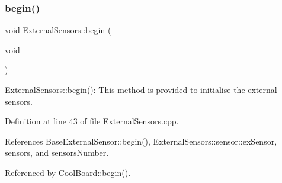 \subsubsection{\texorpdfstring{begin()}{begin()}}
{\footnotesize\ttfamily void External\+Sensors\+::begin (\begin{DoxyParamCaption}\item[{void}]{ }\end{DoxyParamCaption})}

\hyperlink{classExternalSensors_a58ede0d786a86417254708870f04a21e}{External\+Sensors\+::begin()}\+: This method is provided to initialise the external sensors. 

Definition at line 43 of file External\+Sensors.\+cpp.



References Base\+External\+Sensor\+::begin(), External\+Sensors\+::sensor\+::ex\+Sensor, sensors, and sensors\+Number.



Referenced by Cool\+Board\+::begin().


